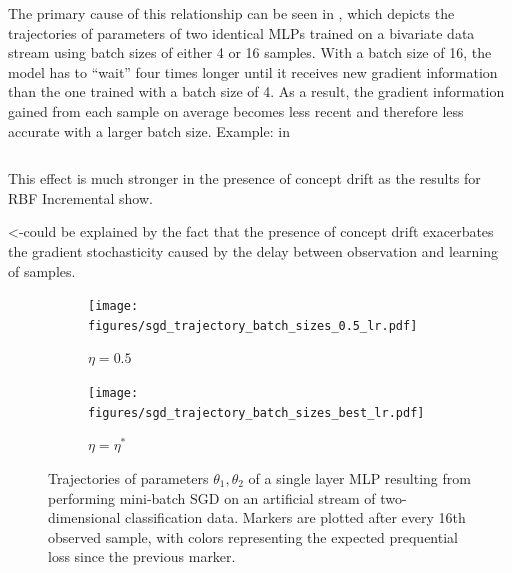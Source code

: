 \documentclass[letterpaper]{article} %
\begin{document}
The primary cause of this relationship can be seen in , which depicts the trajectories of parameters of two identical MLPs trained on a bivariate data stream using batch sizes of either 4 or 16 samples. With a batch size of 16, the model has to “wait” four times longer until it receives new gradient information than the one trained with a batch size of 4. As a result, the gradient information gained from each sample on average becomes less recent and therefore less accurate with a larger batch size. Example: in 

\begin{equation}
\end{equation}


This effect is much stronger in the presence of concept drift as the results for RBF Incremental show.

<-could be explained by the fact that the presence of concept drift exacerbates the gradient stochasticity caused by the delay between observation and learning of samples.



\begin{figure}
	\centering
	\begin{subfigure}[h]{0.2\textwidth}
		\centering
		\texttt{[image: figures/sgd\_trajectory\_batch\_sizes\_0.5\_lr.pdf]}
		\caption{$\eta = 0.5$}\label{fig:trajectory_batch_sizes_0.5_lr}
	\end{subfigure}
	\begin{subfigure}[h]{0.26\textwidth}
		\centering
		\texttt{[image: figures/sgd\_trajectory\_batch\_sizes\_best\_lr.pdf]}
		\caption{$\eta = \eta^*$}\label{fig:trajectory_batch_sizes_best_lr}
	\end{subfigure}
	\caption{Trajectories of parameters $\theta_1, \theta_2$ of a single layer MLP resulting from performing mini-batch SGD on an artificial stream of two-dimensional classification data. Markers are plotted after every 16th observed sample, with colors representing the expected prequential loss since the previous marker.}\label{fig:trajectory_batch_sizes}
\end{figure}
\end{document}
